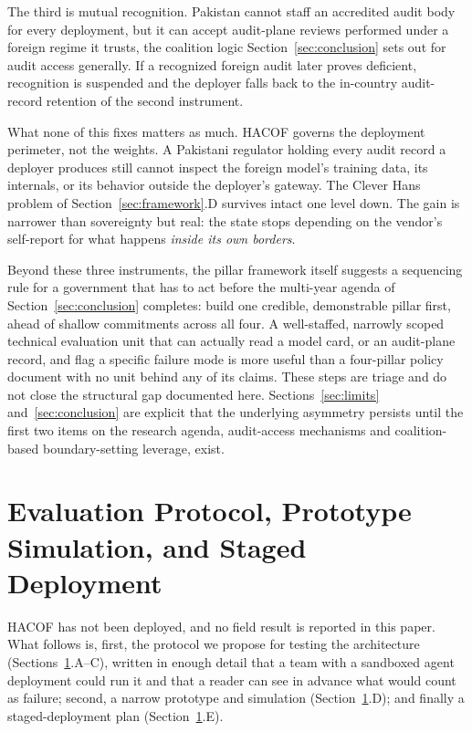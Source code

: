 \documentclass{ieeeaccess}
\newcommand{\hacof}{HACOF}
\begin{document}
The third is mutual recognition. Pakistan cannot staff an accredited audit body for every deployment, but it can accept audit-plane reviews performed under a foreign regime it trusts, the coalition logic Section~\ref{sec:conclusion} sets out for audit access generally. If a recognized foreign audit later proves deficient, recognition is suspended and the deployer falls back to the in-country audit-record retention of the second instrument.

What none of this fixes matters as much. \hacof{} governs the deployment perimeter, not the weights. A Pakistani regulator holding every audit record a deployer produces still cannot inspect the foreign model's training data, its internals, or its behavior outside the deployer's gateway. The Clever Hans problem of Section~\ref{sec:framework}.D survives intact one level down. The gain is narrower than sovereignty but real: the state stops depending on the vendor's self-report for what happens \textit{inside its own borders}.

Beyond these three instruments, the pillar framework itself suggests a sequencing rule for a government that has to act before the multi-year agenda of Section~\ref{sec:conclusion} completes: build one credible, demonstrable pillar first, ahead of shallow commitments across all four. A well-staffed, narrowly scoped technical evaluation unit that can actually read a model card, or an audit-plane record, and flag a specific failure mode is more useful than a four-pillar policy document with no unit behind any of its claims. These steps are triage and do not close the structural gap documented here. Sections~\ref{sec:limits} and~\ref{sec:conclusion} are explicit that the underlying asymmetry persists until the first two items on the research agenda, audit-access mechanisms and coalition-based boundary-setting leverage, exist.

\section{Evaluation Protocol, Prototype Simulation, and Staged Deployment}
\label{sec:eval}

\hacof{} has not been deployed, and no field result is reported in this paper. What follows is, first, the protocol we propose for testing the architecture (Sections~\ref{sec:eval}.A--C), written in enough detail that a team with a sandboxed agent deployment could run it and that a reader can see in advance what would count as failure; second, a narrow prototype and simulation (Section~\ref{sec:eval}.D); and finally a staged-deployment plan (Section~\ref{sec:eval}.E).
\end{document}
